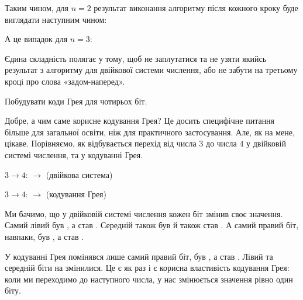 Таким чином, для $n=2$ результат виконання алгоритму після кожного кроку буде виглядати наступним чином:
\par{}\par
\par{}\par
\par{}\par
\par{}\par

А це випадок для $n=3$:
\par{}\par
\par{}\par
\par{}\par
\par{}\par

Єдина складність полягає у тому, щоб не заплутатися та не узяти якийсь результат з алгоритму для двійкової системи числення, або не забути на третьому кроці про слова «задом-наперед».

\begin{exercise}
Побудувати коди Грея для чотирьох біт.
\end{exercise}

Добре, а чим саме корисне кодування Грея?
Це досить специфічне питання більше для загальної освіти, ніж для практичного застосування.
Але, як на мене, цікаве.
Порівняємо, як відбувається перехід від числа $3$ до числа $4$ у двійковій системі числення, та у кодуванні Грея.

\par$3 \to 4$:  $\to$  (двійкова система)
\par$3 \to 4$:  $\to$  (кодування Грея)

Ми бачимо, що у двійковій системі числення кожен біт змінив своє значення.
Самий лівий був , а став .
Середній також був  й також став .
А самий правий біт, навпаки, був , а став .

У кодуванні Грея помінявся лише самий правий біт, був , а став .
Лівий та середній біти на змінилися.
Це є як раз і є корисна властивість кодування Грея: коли ми переходимо до наступного числа, у нас змінюється значення рівно один біту.

